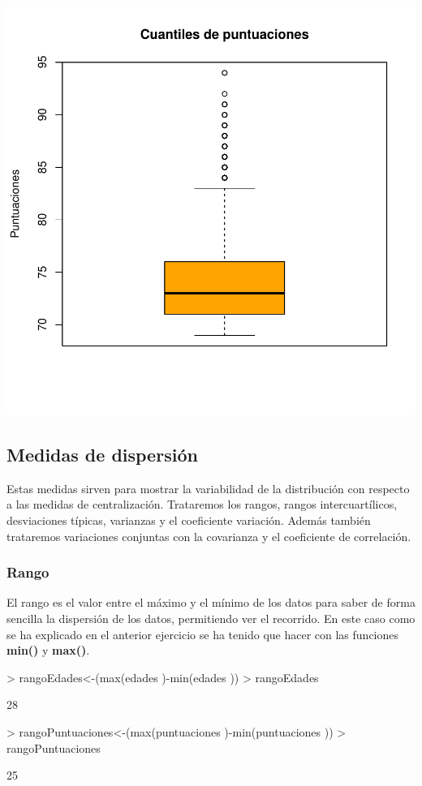 \documentclass [a4paper] {article}
\begin{document}
\begin{center}
\includegraphics{Practica1-041}
\end{center}

\subsection{Medidas de dispersión}
Estas medidas sirven para mostrar la variabilidad de la distribución con respecto a las medidas de centralización. Trataremos los rangos, rangos intercuartílicos, desviaciones típicas, 
varianzas y el coeficiente variación. Además también trataremos variaciones conjuntas con la covarianza y el coeficiente de correlación.

\subsubsection{ Rango}
El rango es el valor entre el máximo y el mínimo de los datos para saber de forma sencilla la dispersión de los datos, permitiendo ver el recorrido. En este caso
como se ha explicado en el anterior ejercicio se ha tenido que hacer con las funciones \textbf{min()} y \textbf{max()}.

\begin{Schunk}
\begin{Sinput}
> rangoEdades<-(max(edades )-min(edades ))
> rangoEdades
\end{Sinput}
\begin{Soutput}
[1] 28
\end{Soutput}
\begin{Sinput}
> rangoPuntuaciones<-(max(puntuaciones )-min(puntuaciones ))
> rangoPuntuaciones
\end{Sinput}
\begin{Soutput}
[1] 25
\end{Soutput}
\end{Schunk}
\end{document}
